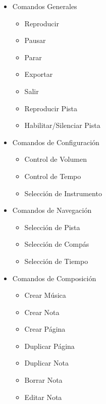 \begin{itemize}
    \item Comandos Generales
    \begin{itemize}
        \item  Reproducir
        \item Pausar
        \item Parar
        \item Exportar
        \item Salir
        \item Reproducir Pista
        \item Habilitar/Silenciar Pista
    \end{itemize}
    \item Comandos de Configuraci\'on
    \begin{itemize}
        \item Control de Volumen
        \item Control de Tempo
        \item Selecci\'on de Instrumento
    \end{itemize}
    \item Comandos de Navegaci\'on
    \begin{itemize}
        \item Selecci\'on de Pista
        \item Selecci\'on de Comp\'as
        \item Selecci\'on de Tiempo
    \end{itemize}
    \item Comandos de Composici\'on
    \begin{itemize}
        \item Crear M\'usica
        \item Crear Nota
        \item Crear P\'agina
        \item Duplicar P\'agina
        \item Duplicar Nota
        \item Borrar Nota
        \item Editar Nota
    \end{itemize}
\end{itemize}

